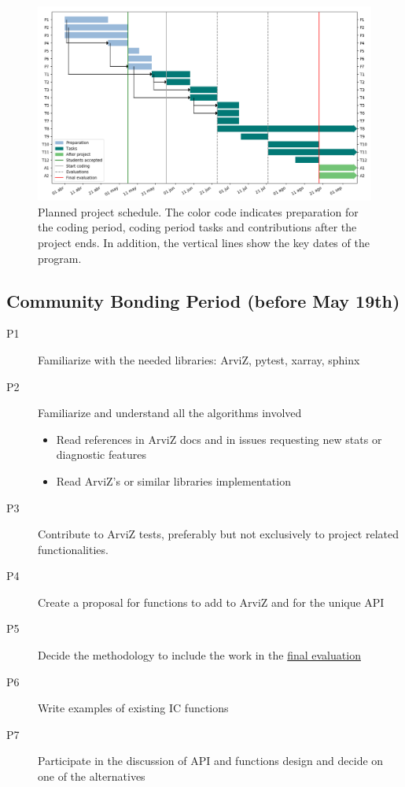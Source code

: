 \documentclass{article}
\begin{document}
\begin{figure}[!htb]
\centering
\includegraphics[width=\linewidth]{gnatt.png}
\caption{Planned project schedule. The color code indicates preparation for the coding period, coding period tasks and contributions after the project ends. In addition, the vertical lines show the key dates of the program.}\label{gnatt}
\end{figure}

\subsection{\texorpdfstring{\textbf{Community Bonding Period} (before
May
19th)}{Community Bonding Period (before May 19th)}}\label{community-bonding-period-before-may-19th}

\begin{description}
\item[P1] Familiarize with the needed libraries: ArviZ, pytest, xarray,
  sphinx
\item[P2] Familiarize and understand all the algorithms involved
  \begin{itemize}
    \item Read references in ArviZ docs and in issues requesting new stats or
  diagnostic features
    \item Read ArviZ's or similar libraries implementation
  \end{itemize}
\item[P3] Contribute to ArviZ tests, preferably but not exclusively to
  project related functionalities.
\item[P4] Create a proposal for functions to add to ArviZ and for the unique
  API
\item[P5] Decide the methodology to include the work in the
  \href{https://google.github.io/gsocguides/student/evaluations\#final-evaluations-and-work-product-submission}{final
  evaluation}
\item[P6] Write examples of existing IC functions
\item[P7] Participate in the discussion of API and functions design and
  decide on one of the alternatives
\end{description}\vspace{1ex}
\end{document}
